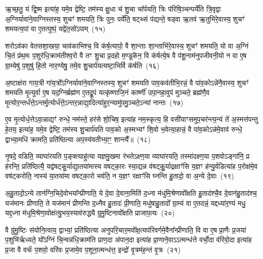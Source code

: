 ऋ॒च्छ॒तु॒ यं द्वि॒ष्म इत्या॑ह॒ यमे॒व द्वेष्टि॒ तम॑स्य क्षु॒धा च॑ शु॒चा चा᳚र्पयति॒ त्रिः प॑रिषि॒ञ्चन्पर्ये॑ति त्रि॒वृद्वा अ॒ग्निर्यावा॑ने॒वाग्निस्तस्य॒ शुचꣳ॑ शमयति॒ त्रिः पुनः॒ पर्ये॑ति॒ षट्थ्सं प॑द्यन्ते॒ षड्वा ऋ॒तव॑ ऋ॒तुभि॑रे॒वास्य॒ शुचꣳ॑ शमयत्य॒पां वा ए॒तत्पुष्पं॒ यद्वे॑त॒सो॑\-ऽपाम्~(१५)

शरो\-ऽव॑का वेतसशा॒खया॒ चाव॑काभिश्च॒ वि क॑र्\mbox{}ष॒त्यापो॒ वै शा॒न्ताः शा॒न्ताभि॑रे॒वास्य॒ शुचꣳ॑ शमयति॒ यो वा अ॒ग्निं चि॒तं प्र॑थ॒मः प॒शुर॑धि॒क्राम॑तीश्व॒रो वै तꣳ शु॒चा प्र॒दहो म॒ण्डूके॑न॒ वि क॑र्\mbox{}षत्ये॒ष वै प॑शू॒नाम॑नुपजीवनी॒यो न वा ए॒ष ग्रा॒म्येषु॑ प॒शुषु॑ हि॒तो नार॒ण्येषु॒ तमे॒व शु॒चार्प॑यत्यष्टा॒भिर्वि क॑र्\mbox{}षति~(१६)

अ॒ष्टाक्ष॑रा गाय॒त्री गा॑य॒त्रो᳚\-ऽग्निर्यावा॑ने॒वाग्निस्तस्य॒ शुचꣳ॑ शमयति पाव॒कव॑तीभि॒रन्नं॒ वै पा॑व॒को\-ऽन्ने॑नै॒वास्य॒ शुचꣳ॑ शमयति मृ॒त्युर्वा ए॒ष यद॒ग्निर्ब्रह्म॑ण ए॒तद्रू॒पं यत्कृ॑ष्णाजि॒नं कार्\mbox{}ष्णी॑ उपा॒नहा॒वुप॑ मुञ्चते॒ ब्रह्म॑णै॒व मृ॒त्योर॒न्तर्ध॑त्ते॒\-ऽन्तर्मृ॒त्योर्ध॑त्ते॒\-ऽन्तर॒न्नाद्या॒दित्या॑हुर॒न्यामु॑पमु॒ञ्चते॒\-ऽन्यां नान्तः~(१७)

ए॒व मृ॒त्योर्ध॒त्ते\-ऽवा॒न्नाद्यꣳ॑ रुन्धे॒ नम॑स्ते॒ हर॑से शो॒चिष॒ इत्या॑ह नम॒स्कृत्य॒ हि वसी॑याꣳसमुप॒चर॑न्त्य॒न्यं ते॑ अ॒स्मत्त॑पन्तु हे॒तय॒ इत्या॑ह॒ यमे॒व द्वेष्टि॒ तम॑स्य शु॒चार्प॑यति पाव॒को अ॒स्मभ्यꣳ॑ शि॒वो भ॒वेत्या॒हान्नं॒ वै पा॑व॒को\-ऽन्न॑मे॒वाव॑ रुन्धे॒ द्वाभ्या॒मधि॑ क्रामति॒ प्रति॑ष्ठित्या अप॒स्य॑वतीभ्या॒ꣳ॒ शान्त्यै᳚॥~(१८)

{\anuvakamend[{शुग्वे॑त॒सो॑\-ऽपाम॑ष्टा॒भिर्विक॑र्\mbox{}षति॒ नान्तरेका॒न्नप॑ञ्चा॒शच्च॑}]}%

नृ॒षदे॒ वडिति॒ व्याघा॑रयति प॒ङ्क्त्याहु॑त्या यज्ञमु॒खमा र॑भते\-ऽक्ष्ण॒या व्याघा॑रयति॒ तस्मा॑दक्ष्ण॒या प॒शवो\-ऽङ्गा॑नि॒ प्र ह॑रन्ति॒ प्रति॑ष्ठित्यै॒ यद्व॑षट्कु॒र्याद्या॒तया॑मास्य वषट्का॒रः स्या॒द्यन्न व॑षट्कु॒॒र्याद्रक्षाꣳ॑सि य॒ज्ञꣳ ह॑न्यु॒र्वडित्या॑ह प॒रोक्ष॑मे॒व वष॑ट्करोति॒ नास्य॑ या॒तया॑मा वषट्का॒रो भव॑ति॒ न य॒ज्ञꣳ रक्षाꣳ॑सि घ्नन्ति हु॒तादो॒ वा अ॒न्ये दे॒वाः~(१९)

अ॒हु॒तादो॒\-ऽन्ये तान॑ग्नि॒चिदे॒वोभया᳚न्प्रीणाति॒ ये दे॒वा दे॒वाना॒मिति॑ द॒ध्ना म॑धुमि॒श्रेणावो᳚क्षति हु॒ताद॑श्चै॒व दे॒वान॑हु॒ताद॑श्च॒ यज॑मानः प्रीणाति॒ ते यज॑मानं प्रीणन्ति द॒ध्नैव हु॒तादः॑ प्री॒णाति॒ मधु॑षाहु॒तादो᳚ ग्रा॒म्यं वा ए॒तदन्नं॒ यद्दध्या॑र॒ण्यं मधु॒ यद्द॒ध्ना म॑धुमि॒श्रेणा॒वोक्ष॑त्यु॒भय॒स्याव॑रुद्ध्यै ग्रुमु॒ष्टिनावो᳚क्षति प्राजाप॒त्यः~(२०)

वै ग्रु॑मु॒ष्टिः स॑योनि॒त्वाय॒ द्वाभ्यां॒ प्रति॑ष्ठित्या अनुपरि॒चार॒मवो᳚क्ष॒त्यप॑रिवर्गमे॒वैना᳚न्प्रीणाति॒ वि वा ए॒ष प्रा॒णैः प्र॒जया॑ प॒शुभि॑र्\mbox{}ऋध्यते॒ यो᳚\-ऽग्निं चि॒न्वन्न॑धि॒क्राम॑ति प्राण॒दा अ॑पान॒दा इत्या॑ह प्रा॒णाने॒वा\-ऽऽ\-त्मन्ध॑त्ते वर्चो॒दा व॑रिवो॒दा इत्या॑ह प्र॒जा वै वर्चः॑ प॒शवो॒ वरि॑वः प्र॒जामे॒व प॒शूना॒त्मन्ध॑त्त॒ इन्द्रो॑ वृ॒त्रम॑ह॒न्तं वृ॒त्रः~(२१)

